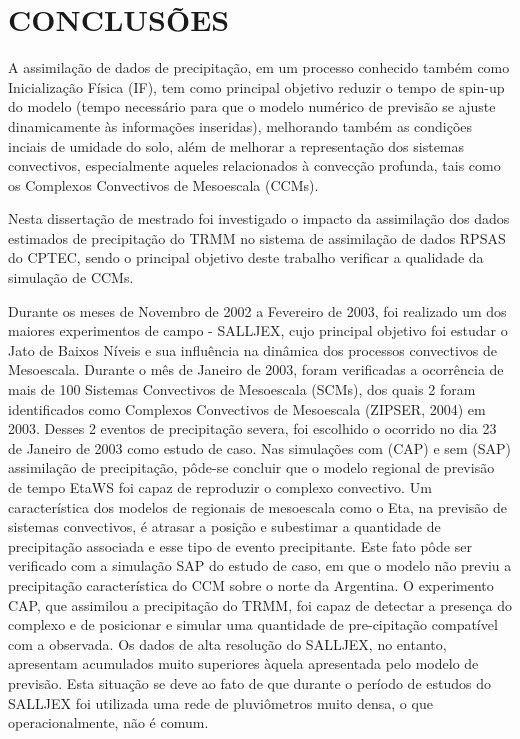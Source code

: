 \hypertarget{estilo:capitulo}{}
\chapter{CONCLUSÕES}

A assimilação de dados de precipitação, em um processo conhecido também como Inicialização Física (IF), tem como principal objetivo reduzir o tempo de spin-up do modelo (tempo necessário para que o modelo numérico de previsão se ajuste dinamicamente às informações inseridas), melhorando também as condições inciais de umidade do solo, além de melhorar a representação dos sistemas convectivos, especialmente aqueles relacionados à convecção profunda, tais como os Complexos Convectivos de Mesoescala (CCMs).

Nesta dissertação de mestrado foi investigado o impacto da assimilação dos dados estimados de precipitação do TRMM no sistema de assimilação de dados RPSAS do CPTEC, sendo o principal objetivo deste trabalho verificar a qualidade da simulação de CCMs.

Durante os meses de Novembro de 2002 a Fevereiro de 2003, foi realizado um dos maiores experimentos de campo - SALLJEX, cujo principal objetivo foi estudar o Jato de Baixos Níveis e sua influência na dinâmica dos processos convectivos de Mesoescala. Durante o mês de Janeiro de 2003, foram verificadas a ocorrência de mais de 100 Sistemas Convectivos de Mesoescala (SCMs), dos quais 2 foram identificados como Complexos Convectivos de Mesoescala (ZIPSER, 2004) em 2003.  Desses 2 eventos de precipitação severa, foi escolhido o ocorrido no dia 23 de Janeiro de 2003 como estudo de caso. Nas simulações com (CAP) e sem (SAP) assimilação de precipitação, pôde-se concluir que o modelo regional de previsão de tempo EtaWS foi capaz de reproduzir o complexo convectivo. Um característica dos modelos de regionais de mesoescala como o Eta, na previsão de sistemas convectivos, é atrasar a posição e subestimar a quantidade de precipitação associada e esse tipo de evento precipitante. Este fato pôde ser verificado com a simulação SAP do estudo de caso, em que o modelo não previu a precipitação característica do CCM sobre o norte da Argentina. O experimento CAP, que assimilou a precipitação do TRMM, foi capaz de detectar a presença do complexo e de posicionar e simular uma quantidade de pre-cipitação compatível com a observada. Os dados de alta resolução do SALLJEX, no entanto, apresentam acumulados muito superiores àquela apresentada pelo modelo de previsão. Esta situação se deve ao fato de que durante o período de estudos do SALLJEX foi utilizada uma rede de pluviômetros muito densa, o que operacionalmente, não é comum.

